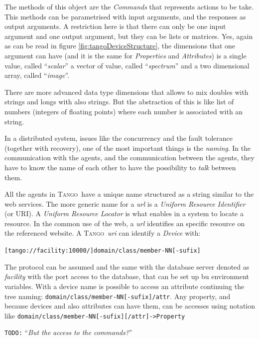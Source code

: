 \documentclass[10pt,a4paper,twoside]{llncs}
\newcommand{\todo}[1]{\texttt{\color{red}TODO:} ``\emph{#1}''}
\newcommand{\tango}{\textsc{Tango}}
\begin{document}
The methods of this object are the \emph{Commands} that represents actions to be take. This methods can be parametrised with input arguments, and the responses as output arguments. A restriction here is that there can only be one input argument and one output argument, but they can be lists or matrices. Yes, again as can be read in figure \ref{fig:tangoDeviceStructure}, the dimensions that one argument can have (and it is the same for \emph{Properties} and \emph{Attributes}) is a single value, called ``\emph{scalar}'' a vector of value, called ``\emph{spectrum}'' and a two dimensional array, called ``\emph{image}''.

There are more advanced data type dimensions that allows to mix doubles with strings and longs with also strings. But the abstraction of this is like list of numbers (integers of floating points) where each number is associated with an string. 

In a distributed system, issues like the concurrency and the fault tolerance (together with recovery), one of the most important things is the \emph{naming}. In the communication with the agents, and the communication between the agents, they have to know the name of each other to have the possibility to \emph{talk} between them.

All the agents in \tango\, have a unique name structured as a string similar to the web services. The more generic name for a \emph{url} is a \emph{Uniform Resource Identifier} (or URI). A \emph{Uniform Resource Locator} is what enables in a system to locate a resource. In the common use of the web, a \emph{url} identifies an specific resource on the referenced website. A \tango\, \emph{uri} can identify a \emph{Device} with:
\begin{center}
 {\tt [tango://facility:10000/]domain/class/member-NN[-sufix]}
\end{center}
The protocol can be assumed and the same with the database server denoted as \emph{facility} with the port access to the database, that can be set up bu environment variables. With a device name is possible to access an attribute continuing the tree naming: {\tt domain/class/member-NN[-sufix]/attr}. Any property, and because devices and also attributes can have them, can be accesses using notation like {\tt domain/class/member-NN[-sufix][/attr]->Property}

\todo{But the access to the commands?}

\end{document}
